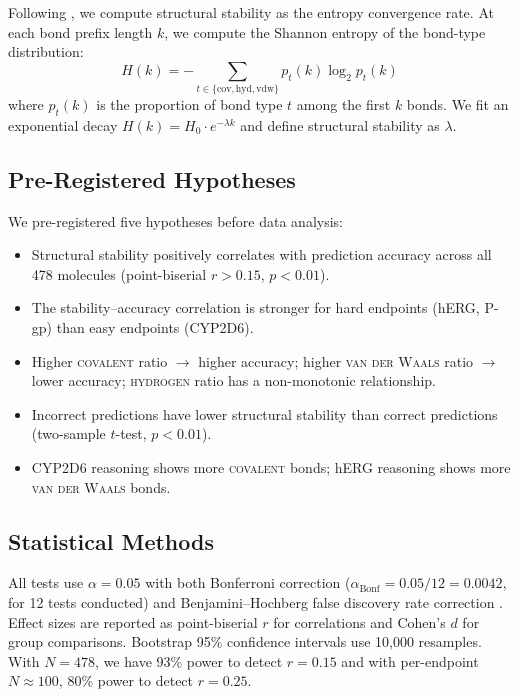 \documentclass[11pt]{article}
\newcommand{\cov}{\textsc{covalent}}
\newcommand{\hyd}{\textsc{hydrogen}}
\newcommand{\vdw}{\textsc{van der Waals}}
\begin{document}
Following \citet{chen2026molecular}, we compute structural stability as the entropy convergence rate. At each bond prefix length $k$, we compute the Shannon entropy \citep{shannon1948mathematical} of the bond-type distribution:
\begin{equation}
H(k) = -\sum_{t \in \{\text{cov}, \text{hyd}, \text{vdw}\}} p_t(k) \log_2 p_t(k)
\end{equation}
where $p_t(k)$ is the proportion of bond type $t$ among the first $k$ bonds. We fit an exponential decay $H(k) = H_0 \cdot e^{-\lambda k}$ and define structural stability as $\lambda$.

\subsection{Pre-Registered Hypotheses}
\label{sec:hypotheses}

We pre-registered five hypotheses before data analysis:

\begin{itemize}[leftmargin=*]
    \item[\textbf{H1}] Structural stability positively correlates with prediction accuracy across all 478 molecules (point-biserial $r > 0.15$, $p < 0.01$).

    \item[\textbf{H2}] The stability--accuracy correlation is stronger for hard endpoints (hERG, P-gp) than easy endpoints (CYP2D6).

    \item[\textbf{H3}] Higher \cov{} ratio $\rightarrow$ higher accuracy; higher \vdw{} ratio $\rightarrow$ lower accuracy; \hyd{} ratio has a non-monotonic relationship.

    \item[\textbf{H4}] Incorrect predictions have lower structural stability than correct predictions (two-sample $t$-test, $p < 0.01$).

    \item[\textbf{H5}] CYP2D6 reasoning shows more \cov{} bonds; hERG reasoning shows more \vdw{} bonds.
\end{itemize}

\subsection{Statistical Methods}

All tests use $\alpha = 0.05$ with both Bonferroni correction ($\alpha_{\text{Bonf}} = 0.05 / 12 = 0.0042$, for 12 tests conducted) and Benjamini--Hochberg false discovery rate correction \citep{benjamini1995controlling}. Effect sizes are reported as point-biserial $r$ for correlations and Cohen's $d$ \citep{cohen1988statistical} for group comparisons. Bootstrap 95\% confidence intervals use 10,000 resamples. With $N = 478$, we have 93\% power to detect $r = 0.15$ and with per-endpoint $N \approx 100$, 80\% power to detect $r = 0.25$.
\end{document}

